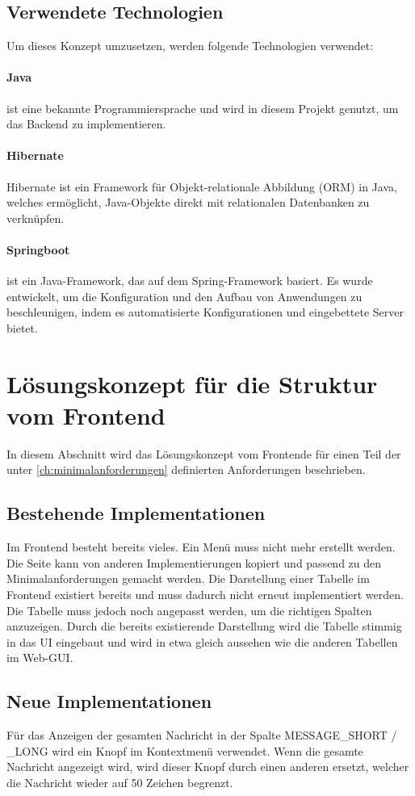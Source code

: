 \subsection{Verwendete Technologien}
Um dieses Konzept umzusetzen, werden folgende Technologien verwendet:

\paragraph{Java} ist eine bekannte Programmiersprache und wird in diesem Projekt genutzt, um das Backend zu implementieren.
\paragraph{Hibernate} Hibernate ist ein Framework für Objekt-relationale Abbildung (ORM) in Java, welches ermöglicht, Java-Objekte direkt mit relationalen Datenbanken zu verknüpfen.
\paragraph{Springboot} ist ein Java-Framework, das auf dem Spring-Framework basiert. Es wurde entwickelt, um die Konfiguration und den Aufbau von Anwendungen zu beschleunigen, indem es automatisierte Konfigurationen und eingebettete Server bietet.

\section{Lösungskonzept für die Struktur vom Frontend}
In diesem Abschnitt wird das Lösungskonzept vom Frontende für einen Teil der unter \ref{ch:minimalanforderungen} definierten Anforderungen beschrieben.

\subsection{Bestehende Implementationen}
Im Frontend besteht bereits vieles. Ein Menü muss nicht mehr erstellt werden. Die Seite kann von anderen Implementierungen kopiert und passend zu den Minimalanforderungen gemacht werden. Die Darstellung einer Tabelle im Frontend existiert bereits und muss dadurch nicht erneut implementiert werden. Die Tabelle muss jedoch noch angepasst werden, um die richtigen Spalten anzuzeigen. Durch die bereits existierende Darstellung wird die Tabelle stimmig in das UI eingebaut und wird in etwa gleich aussehen wie die anderen Tabellen im Web-GUI.

\subsection{Neue Implementationen}
Für das Anzeigen der gesamten Nachricht in der Spalte MESSAGE\_SHORT / \_LONG wird ein Knopf im Kontextmenü verwendet. Wenn die gesamte Nachricht angezeigt wird, wird dieser Knopf durch einen anderen ersetzt, welcher die Nachricht wieder auf 50 Zeichen begrenzt.

